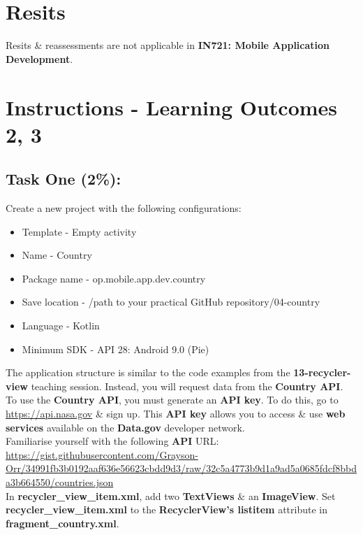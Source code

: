 \documentclass{article}
\begin{document}
\section*{Resits}
Resits \& reassessments are not applicable in \textbf{IN721: Mobile Application Development}.

\section*{Instructions - Learning Outcomes 2, 3}
\subsection*{Task One (2\%):}
Create a new project with the following configurations:
\begin{itemize}
	\item Template - Empty activity
	\item Name - Country
	\item Package name - op.mobile.app.dev.country
	\item Save location - /path to your practical GitHub repository/04-country
	\item Language - Kotlin
	\item Minimum SDK - API 28: Android 9.0 (Pie) 
\end{itemize} 

The application structure is similar to the code examples from the \textbf{13-recycler-view} teaching session. Instead, you will request data from the \textbf{Country API}. \\

To use the \textbf{Country API}, you must generate an \textbf{API key}. To do this, go to \href{https://api.nasa.gov}{https://api.nasa.gov} \& sign up. This \textbf{API key} allows you to access \& use \textbf{web services} available on the \textbf{Data.gov} developer network. \\

Familiarise yourself with the following \textbf{API} URL: \\

\href{https://gist.githubusercontent.com/Grayson-Orr/34991fb3b0192aaf636e56623cbdd9d3/raw/32c5a4773b9d1a9ad5a0685fdcf8bbda3b664550/countries.json}{https://gist.githubusercontent.com/Grayson-Orr/34991fb3b0192aaf636e56623cbdd9d3/raw/32c5a4773b9d1a9ad5a0685fdcf8bbda3b664550/countries.json} \\

In \textbf{recycler\_view\_item.xml}, add two \textbf{TextViews} \& an \textbf{ImageView}. Set \textbf{recycler\_view\_item.xml} to the \textbf{RecyclerView's listitem} attribute in \textbf{fragment\_country.xml}. \\
\end{document}
